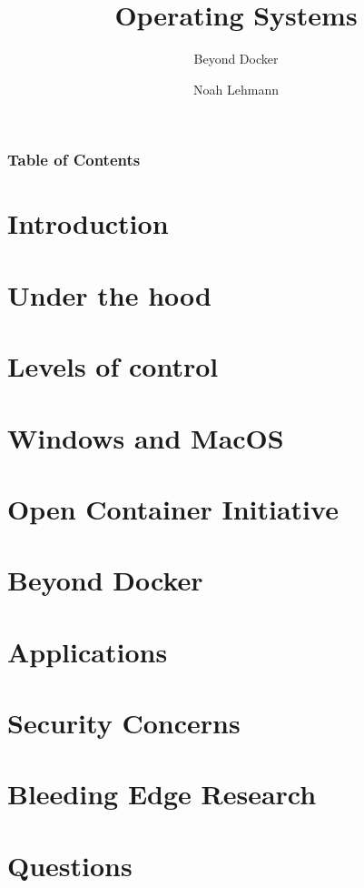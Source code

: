 \documentclass[12pt]{beamer}
\title{Operating Systems}
\subtitle{Beyond Docker}
\author{Noah Lehmann}
\institute{Instiute of Information Systems, Hof University}
\begin{document}
    \begin{frame}
        \titlepage
    \end{frame}

    \begin{frame}
        \frametitle{Table of Contents}
        \hfill
        \parbox[c]{.9\textwidth}{
            \begin{minipage}[c][0.75\textheight]{\textwidth}
                \tableofcontents
            \end{minipage}
        }
    \end{frame}

    \section{Introduction}
    \label{sec:introduction}
    

    \section{Under the hood}
    \label{sec:under_the_hood}
    

    \section{Levels of control}
    \label{sec:levels_of_control}
    

    \section{Windows and MacOS}
    \label{sec:windows_and_macos}
    

    \section{Open Container Initiative}
    \label{sec:oci}
    

    \section{Beyond Docker}
    \label{sec:beyond_docker}
    

    \section{Applications}
    \label{sec:applications}
    

    \section{Security Concerns}
    \label{sec:security}
    

    \section{Bleeding Edge Research}
    \label{sec:research}
    

    \section{Questions}
    \label{sec:questions}
    
\end{document}
